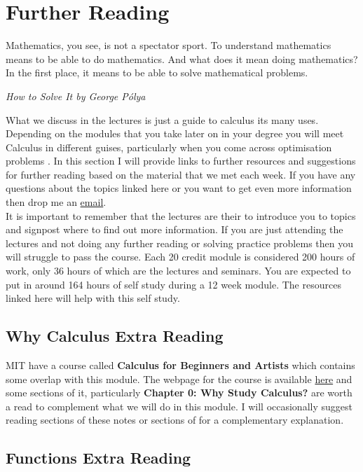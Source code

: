 \chapter{Further Reading}
\label{sec:further reading}

\epigraph{Mathematics, you see, is not a spectator sport. To understand mathematics means to be able to do mathematics. And what does it mean doing mathematics? In the first place, it means to be able to solve mathematical problems. }{\textit{How to Solve It by George P\'{o}lya}}

What we discuss in the lectures is just a guide to calculus its many uses. Depending on the modules that you take later on in your degree you will meet Calculus in different guises, particularly when you come across optimisation problems . In this section I will provide links to further resources and suggestions for further reading based on the material that we met each week. If you have any questions about the topics linked here or you want to get even more information then drop me an \href{mailto:rossc@edgehill.ac.uk}{email}.\\

It is important to remember that the lectures are their to introduce you to topics and signpost where to find out more information. If you are just attending the lectures and not doing any further reading or solving practice problems then you will struggle to pass the course. Each 20 credit module is considered 200 hours of work, only 36 hours of which are the lectures and seminars. You are expected to put in around 164 hours of self study during a 12 week module. The resources linked here will help with this self study.\\

\section{Why Calculus Extra Reading}
MIT have a course called \textbf{Calculus for Beginners and Artists} which contains some overlap with this module.  The webpage for the course is available \href{https://math.mit.edu/~djk/calculus_beginners/index.html}{here} and some sections of it, particularly \textbf{Chapter 0: Why Study Calculus?} are worth a read to complement what we will do in this module. I will occasionally suggest reading sections of these notes or sections of \citep{calcI} for a complementary explanation. 



\section{Functions Extra Reading}


